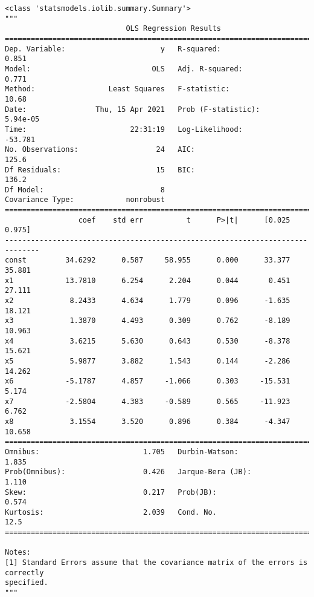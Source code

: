 \documentclass[11pt]{ctexart}
\makeatletter
\newcommand{\boxspacing}{\kern\kvtcb@left@rule\kern\kvtcb@boxsep}
\newcommand{\prompt}[4]{
        {\ttfamily\llap{{\color{#2}[#3]:\hspace{3pt}#4}}\vspace{-\baselineskip}}
    }
\makeatother
\begin{document}
            \begin{tcolorbox}[breakable, size=fbox, boxrule=.5pt, pad at break*=1mm, opacityfill=0]
\prompt{Out}{outcolor}{13}{\boxspacing}
\begin{Verbatim}[commandchars=\\\{\}]
<class 'statsmodels.iolib.summary.Summary'>
"""
                            OLS Regression Results
==============================================================================
Dep. Variable:                      y   R-squared:                       0.851
Model:                            OLS   Adj. R-squared:                  0.771
Method:                 Least Squares   F-statistic:                     10.68
Date:                Thu, 15 Apr 2021   Prob (F-statistic):           5.94e-05
Time:                        22:31:19   Log-Likelihood:                -53.781
No. Observations:                  24   AIC:                             125.6
Df Residuals:                      15   BIC:                             136.2
Df Model:                           8
Covariance Type:            nonrobust
==============================================================================
                 coef    std err          t      P>|t|      [0.025      0.975]
------------------------------------------------------------------------------
const         34.6292      0.587     58.955      0.000      33.377      35.881
x1            13.7810      6.254      2.204      0.044       0.451      27.111
x2             8.2433      4.634      1.779      0.096      -1.635      18.121
x3             1.3870      4.493      0.309      0.762      -8.189      10.963
x4             3.6215      5.630      0.643      0.530      -8.378      15.621
x5             5.9877      3.882      1.543      0.144      -2.286      14.262
x6            -5.1787      4.857     -1.066      0.303     -15.531       5.174
x7            -2.5804      4.383     -0.589      0.565     -11.923       6.762
x8             3.1554      3.520      0.896      0.384      -4.347      10.658
==============================================================================
Omnibus:                        1.705   Durbin-Watson:                   1.835
Prob(Omnibus):                  0.426   Jarque-Bera (JB):                1.110
Skew:                           0.217   Prob(JB):                        0.574
Kurtosis:                       2.039   Cond. No.                         12.5
==============================================================================

Notes:
[1] Standard Errors assume that the covariance matrix of the errors is correctly
specified.
"""
\end{Verbatim}
\end{tcolorbox}
        
\end{document}
